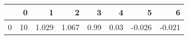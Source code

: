 \begin{tabular}{lrrrrrrr}
\toprule
{} &   0 &      1 &      2 &     3 &     4 &      5 &      6 \\
\midrule
0 &  10 &  1.029 &  1.067 &  0.99 &  0.03 & -0.026 & -0.021 \\
\bottomrule
\end{tabular}
